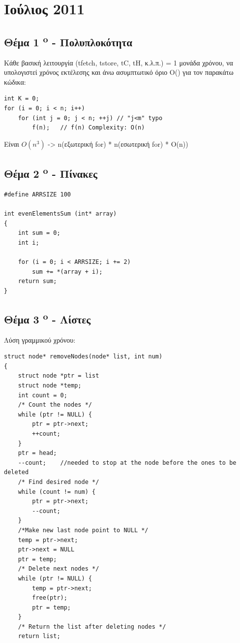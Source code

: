 \documentclass[a4paper,10pt]{article}
\begin{document}

\section{Ιούλιος 2011}

\subsection{Θέμα 1 \textsuperscript{o} - Πολυπλοκότητα}
Κάθε βασική λειτουργία (tfetch, tstore, tC, tH, κ.λ.π.) = 1 μονάδα χρόνου, να
υπολογιστεί χρόνος εκτέλεσης και άνω ασυμπτωτικό όριο Ο() για τον παρακάτω
κώδικα:

\begin{verbatim}
int K = 0;
for (i = 0; i < n; i++)
    for (int j = 0; j < n; ++j) // "j<m" typo
        f(n);   // f(n) Complexity: O(n)
\end{verbatim}
Είναι $O(n^3)$ -> n(εξωτερική for) * n(εσωτερική for) * O(n))

\subsection{Θέμα 2 \textsuperscript{o} - Πίνακες}
\begin{verbatim}
#define ARRSIZE 100

int evenElementsSum (int* array)
{
    int sum = 0;
    int i;

    for (i = 0; i < ARRSIZE; i += 2)
        sum += *(array + i);
    return sum;
}
\end{verbatim}


\subsection{Θέμα 3 \textsuperscript{o} - Λίστες}
Λύση γραμμικού χρόνου:
\begin{verbatim}
struct node* removeNodes(node* list, int num)
{
    struct node *ptr = list
    struct node *temp;
    int count = 0;
    /* Count the nodes */
    while (ptr != NULL) {
        ptr = ptr->next;
        ++count;
    }
    ptr = head;
    --count;    //needed to stop at the node before the ones to be deleted
    /* Find desired node */
    while (count != num) {
        ptr = ptr->next;
        --count;
    }
    /*Make new last node point to NULL */
    temp = ptr->next;
    ptr->next = NULL
    ptr = temp;
    /* Delete next nodes */
    while (ptr != NULL) {
        temp = ptr->next;
        free(ptr);
        ptr = temp;
    }
    /* Return the list after deleting nodes */
    return list;
\end{verbatim}
\end{document}
